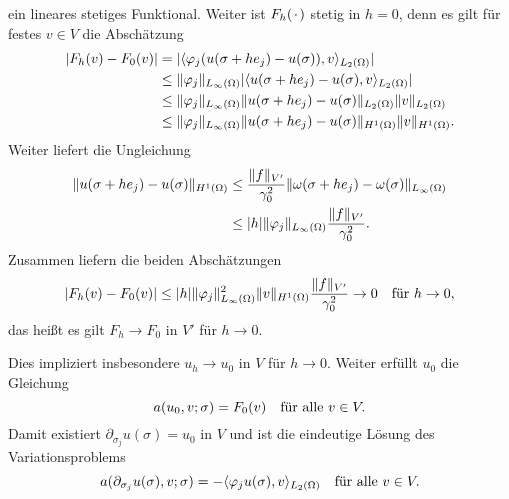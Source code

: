 \begin{Satz}
\begin{Beweis}
\begin{equation}
        \end{equation}
        ein lineares stetiges Funktional.
        Weiter ist $F_{h}(\blank)$ stetig in $h = 0$, denn es gilt für festes $v \in V$ die Abschätzung
        \begin{align}
            \abs{F_{h}(v) - F_{0}(v)}
            &= \abs{\skp{\varphi_{j} (u(\sigma + h e_{j}) - u(\sigma))}{v}{L_{2}(\Omega)}}
            \\&\leq \norm{\varphi_{j}}_{L_{\infty}(\Omega)} \abs{\skp{u(\sigma + h e_{j}) - u(\sigma)}{v}{L_{2}(\Omega)}}
            \\&\leq \norm{\varphi_{j}}_{L_{\infty}(\Omega)} \norm{u(\sigma + h e_{j}) - u(\sigma)}_{L_{2}(\Omega)} \norm{v}_{L_{2}(\Omega)}
            \\&\leq \norm{\varphi_{j}}_{L_{\infty}(\Omega)} \norm{u(\sigma + h e_{j}) - u(\sigma)}_{H^{1}(\Omega)} \norm{v}_{H^{1}(\Omega)}.
        \end{align}
        Weiter liefert  die Ungleichung
        \begin{align}
            \norm{u(\sigma + h e_{j}) - u(\sigma)}_{H^{1}(\Omega)}
            &\leq \frac{\norm{f}_{V'}}{\gamma_{0}^{2}} \norm{\omega(\sigma + h e_{j}) - \omega(\sigma)}_{L_{\infty}(\Omega)}
            \\&\leq \abs{h} \norm{\varphi_{j}}_{L_{\infty}(\Omega)} \frac{\norm{f}_{V'}}{\gamma_{0}^{2}}.
        \end{align}
        Zusammen liefern die beiden Abschätzungen
        \begin{equation}
            \abs{F_{h}(v) - F_{0}(v)} \leq \abs{h} \norm{\varphi_{j}}^{2}_{L_{\infty}(\Omega)} \norm{v}_{H^{1}(\Omega)} \frac{\norm{f}_{V'}}{\gamma_{0}^{2}} \to 0 \quad \text{für}~h \to 0,
        \end{equation}
        das heißt es gilt $F_{h} \to F_{0}$ in $V'$ für $h \to 0$.

        Dies impliziert insbesondere $u_{h} \to u_{0}$ in $V$ für $h \to 0$.
        Weiter erfüllt $u_{0}$ die Gleichung
        \begin{equation}
            a(u_{0}, v; \sigma) = F_{0}(v) \quad \fa v \in V.
        \end{equation}
        Damit existiert $\partial_{\sigma_{j}} u(\sigma) = u_{0}$ in $V$ und ist die eindeutige Lösung des Variationsproblems
        \begin{equation}
            a(\partial_{\sigma_{j}} u(\sigma), v; \sigma) = - \skp{\varphi_{j} u(\sigma)}{v}{L_{2}(\Omega)} \quad \fa v \in V.
        \end{equation}


\end{Beweis}
\end{Satz}
